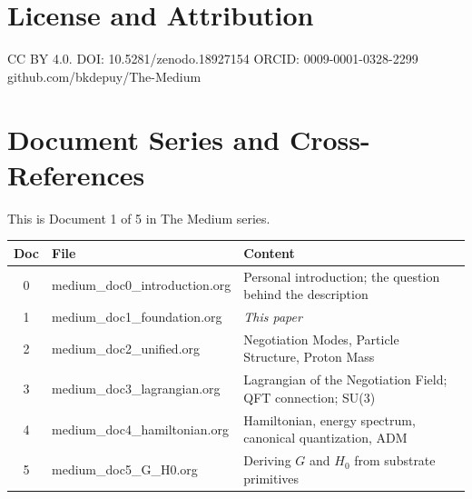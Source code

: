 \documentclass[11pt,letterpaper]{article}
\begin{document}
\section{License and Attribution}
\label{sec:orgc827c1d}

CC BY 4.0. DOI: 10.5281/zenodo.18927154 \quad ORCID: 0009-0001-0328-2299 \quad github.com/bkdepuy/The-Medium

\section{Document Series and Cross-References}
\label{sec:org4c6060b}

This is Document 1 of 5 in The Medium series.

\begin{center}
\begin{tabular}{clp{9cm}}
\toprule
\textbf{Doc} & \textbf{File} & \textbf{Content}\\[0pt]
\midrule
0 & medium\_doc0\_introduction.org & Personal introduction; the question behind the description\\[0pt]
1 & medium\_doc1\_foundation.org & \emph{This paper}\\[0pt]
2 & medium\_doc2\_unified.org & Negotiation Modes, Particle Structure, Proton Mass\\[0pt]
3 & medium\_doc3\_lagrangian.org & Lagrangian of the Negotiation Field; QFT connection; SU(3)\\[0pt]
4 & medium\_doc4\_hamiltonian.org & Hamiltonian, energy spectrum, canonical quantization, ADM\\[0pt]
5 & medium\_doc5\_G\_H0.org & Deriving \(G\) and \(H_0\) from substrate primitives\\[0pt]
\bottomrule
\end{tabular}
\end{center}
\end{document}
